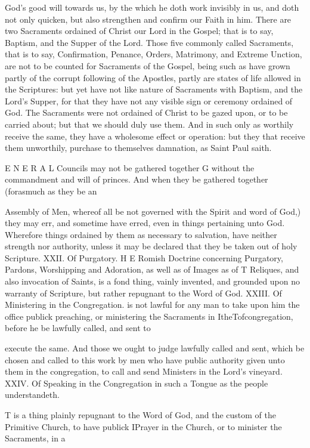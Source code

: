 God’s good will towards us, by the which he doth work invisibly in us, and doth not only quicken, but also strengthen and confirm our Faith in him. There are two Sacraments ordained of Christ our Lord in the Gospel; that is to say, Baptism, and the Supper of the Lord. Those five commonly called Sacraments, that is to say, Confirmation, Penance, Orders, Matrimony, and Extreme Unction, are not to be counted for Sacraments of the Gospel, being such as have grown partly of the corrupt following of the Apostles, partly are states of life allowed in the Scriptures: but yet have not like nature of Sacraments with Baptism, and the Lord’s Supper, for that they have not any visible sign or ceremony ordained of God. The Sacraments were not ordained of Christ to be gazed upon, or to be carried about; but that we should duly use them. And in such only as worthily receive the same, they have a wholesome effect or operation: but they that receive them unworthily, purchase to themselves damnation, as Saint Paul saith.

E N E R A L Councils may not be gathered together G without the commandment and will of princes. And when they be gathered together (forasmuch as they be an

Assembly of Men, whereof all be not governed with the Spirit and word of God,) they may err, and sometime have erred, even in things pertaining unto God. Wherefore things ordained by them as necessary to salvation, have neither strength nor authority, unless it may be declared that they be taken out of holy Scripture. XXII. Of Purgatory. H E Romish Doctrine concerning Purgatory, Pardons, Worshipping and Adoration, as well as of Images as of T Reliques, and also invocation of Saints, is a fond thing, vainly invented, and grounded upon no warranty of Scripture, but rather repugnant to the Word of God. XXIII. Of Ministering in the Congregation. is not lawful for any man to take upon him the office publick preaching, or ministering the Sacraments in ItheTofcongregation, before he be lawfully called, and sent to

execute the same. And those we ought to judge lawfully called and sent, which be chosen and called to this work by men who have public authority given unto them in the congregation, to call and send Ministers in the Lord’s vineyard. XXIV. Of Speaking in the Congregation in such a Tongue as the people understandeth.

T is a thing plainly repugnant to the Word of God, and the custom of the Primitive Church, to have publick IPrayer in the Church, or to minister the Sacraments, in a


